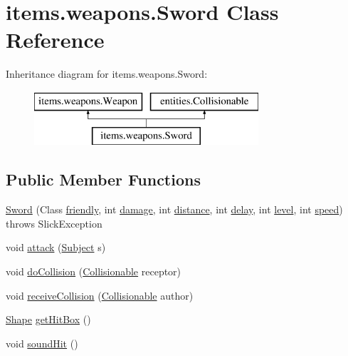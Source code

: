 \hypertarget{classitems_1_1weapons_1_1_sword}{}\section{items.\+weapons.\+Sword Class Reference}
\label{classitems_1_1weapons_1_1_sword}
Inheritance diagram for items.\+weapons.\+Sword\+:\begin{figure}[H]
\begin{center}
\leavevmode
\includegraphics[height=2.000000cm]{classitems_1_1weapons_1_1_sword}
\end{center}
\end{figure}
\subsection*{Public Member Functions}
\begin{DoxyCompactItemize}
\item 
\mbox{\hyperlink{classitems_1_1weapons_1_1_sword_a858d8a5d8fb4356c393ddd8dd726d375}{Sword}} (Class \mbox{\hyperlink{classitems_1_1weapons_1_1_sword_a63363009ee0969e2deb6d1f3af957d58}{friendly}}, int \mbox{\hyperlink{classitems_1_1weapons_1_1_weapon_aa84d0aca66daedb3adb9209b6f2846a3}{damage}}, int \mbox{\hyperlink{classitems_1_1weapons_1_1_weapon_a125dc77704bbb1758d35f282802dcb8d}{distance}}, int \mbox{\hyperlink{classitems_1_1weapons_1_1_sword_a8d69cc681b95f364381987f28546f382}{delay}}, int \mbox{\hyperlink{classitems_1_1weapons_1_1_weapon_ae66ceb47ad12380ee5d39960606980b3}{level}}, int \mbox{\hyperlink{classitems_1_1weapons_1_1_weapon_ac653ddf600cd6add7078dc32b5f1584a}{speed}})  throws Slick\+Exception 
\item 
void \mbox{\hyperlink{classitems_1_1weapons_1_1_sword_ac33fe7c9eaa35120c38e3b546f44f9c1}{attack}} (\mbox{\hyperlink{classentities_1_1_subject}{Subject}} s)
\item 
void \mbox{\hyperlink{classitems_1_1weapons_1_1_sword_a3b4292b936e2d5e5aad2b1f0b2c2f935}{do\+Collision}} (\mbox{\hyperlink{interfaceentities_1_1_collisionable}{Collisionable}} receptor)
\item 
void \mbox{\hyperlink{classitems_1_1weapons_1_1_sword_acf006a33d1194218cc4e3fa2474a401e}{receive\+Collision}} (\mbox{\hyperlink{interfaceentities_1_1_collisionable}{Collisionable}} author)
\item 
\mbox{\hyperlink{classorg_1_1newdawn_1_1slick_1_1geom_1_1_shape}{Shape}} \mbox{\hyperlink{classitems_1_1weapons_1_1_sword_ab34faa345e31beb308cf3fbc3383aebf}{get\+Hit\+Box}} ()
\item 
void \mbox{\hyperlink{classitems_1_1weapons_1_1_sword_aa3aca5fbc0c268828584bcf4c32d9a4c}{sound\+Hit}} ()
\end{DoxyCompactItemize}
